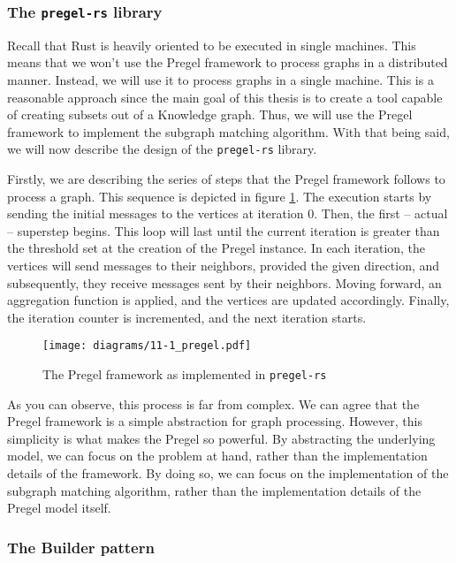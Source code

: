 \subsubsection{The \texttt{pregel-rs} library}

Recall that Rust is heavily oriented to be executed in single machines. This means that we won't use the Pregel framework to process graphs in a distributed manner. Instead, we will use it to process graphs in a single machine. This is a reasonable approach since the main goal of this thesis is to create a tool capable of creating subsets out of a Knowledge graph. Thus, we will use the Pregel framework to implement the subgraph matching algorithm. With that being said, we will now describe the design of the \texttt{pregel-rs} library.

Firstly, we are describing the series of steps that the Pregel framework follows to process a graph. This sequence is depicted in figure \ref{fig:sequence}. The execution starts by sending the initial messages to the vertices at iteration 0. Then, the first -- actual -- superstep begins. This loop will last until the current iteration is greater than the threshold set at the creation of the Pregel instance. In each iteration, the vertices will send messages to their neighbors, provided the given direction, and subsequently, they receive messages sent by their neighbors. Moving forward, an aggregation function is applied, and the vertices are updated accordingly. Finally, the iteration counter is incremented, and the next iteration starts.

\begin{figure}[ht]
    \centering
    \texttt{[image: diagrams/11-1\_pregel.pdf]}
    \caption{The Pregel framework as implemented in \texttt{pregel-rs}}
    \label{fig:sequence}
\end{figure}

As you can observe, this process is far from complex. We can agree that the Pregel framework is a simple abstraction for graph processing. However, this simplicity is what makes the Pregel so powerful. By abstracting the underlying model, we can focus on the problem at hand, rather than the implementation details of the framework. By doing so, we can focus on the implementation of the subgraph matching algorithm, rather than the implementation details of the Pregel model itself.

\subsubsection{The Builder pattern}

